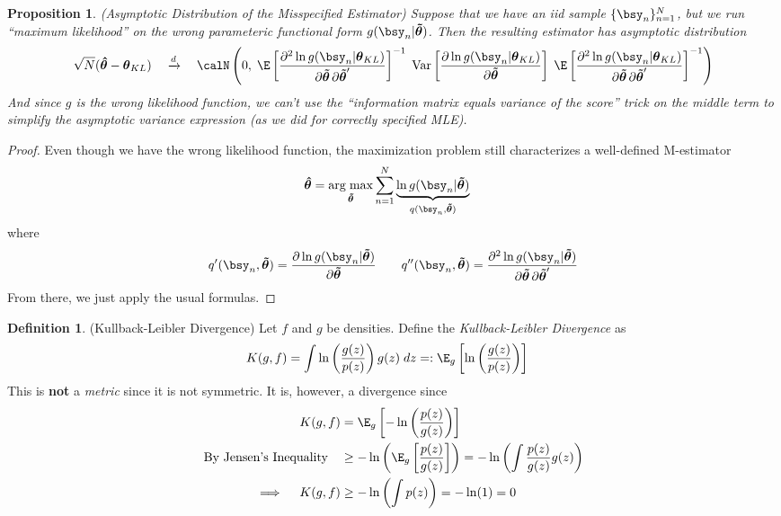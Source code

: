 \documentclass[12pt]{article}
\theoremstyle{plain}
\newtheorem{prop}[thm]{Proposition}
\theoremstyle{definition}
\newtheorem{defn}[thm]{Definition}
\theoremstyle{remark}
\newcommand{\bstheta}{\boldsymbol{\theta}}
\newcommand{\bshattheta}{\boldsymbol{\hat{\theta}}}
\newcommand{\bstildetheta}{\boldsymbol{\tilde{\theta}}}
\DeclareMathOperator*{\argmax}{arg\;max}
\newcommand{\Var}{\operatorname{Var}}
\newcommand{\dto}{\xrightarrow{d}}
\newcommand{\sumnN}{\sum^N_{n=1}}
\newcommand{\nN}{_{n=1}^N}
\begin{document}
\begin{prop}(Asymptotic Distribution of the Misspecified Estimator)
Suppose that we have an iid sample $\{\bsy_n\}\nN$, but we run ``maximum
likelihood'' on the \emph{wrong} parameteric functional form
$g(\bsy_n|\bstildetheta)$. Then the resulting estimator has asymptotic
distribution
\begin{align*}
  \sqrt{N}(\bshattheta-\bstheta_{KL})
  \quad\dto\quad
  \calN\left(0,\;
  \E\left[
  \frac{\partial^2 \ln g(\bsy_n|\bstheta_{KL})}{%
    \partial\bstildetheta\,\partial\bstildetheta'}
  \right]^{-1}
  \;
  \Var\left[
    \frac{\partial \ln g(\bsy_n|\bstheta_{KL})}{\partial \bstildetheta}
  \right]
  \;
  \E\left[
  \frac{\partial^2 \ln g(\bsy_n|\bstheta_{KL})}{%
    \partial\bstildetheta\,\partial\bstildetheta'}
  \right]^{-1}
  \right)
\end{align*}
And since $g$ is the wrong likelihood function, we can't use the
``information matrix equals variance of the score'' trick on the middle
term to simplify the asymptotic variance expression (as we did for
correctly specified MLE).
\end{prop}
\begin{proof}
Even though we have the wrong likelihood function, the maximization
problem still characterizes a well-defined M-estimator
\begin{align*}
  \bshattheta
  &=
  \argmax_{\bstildetheta}
  \sumnN
  \underbrace{%
  \ln g(\bsy_{n}|\bstildetheta)
  }_{q(\bsy_n,\bstildetheta)}
\end{align*}
where
\begin{align*}
  q'(\bsy_n,\bstildetheta)
  =
  \frac{\partial \ln g(\bsy_n|\bstildetheta)}{\partial \bstildetheta}
  \qquad
  q''(\bsy_n,\bstildetheta)
  =
  \frac{\partial^2 \ln g(\bsy_n|\bstildetheta)}{%
    \partial\bstildetheta\,\partial\bstildetheta'}
\end{align*}
From there, we just apply the usual formulas.
\end{proof}


\clearpage
\begin{defn}(Kullback-Leibler Divergence)
Let $f$ and $g$ be densities. Define the
\emph{Kullback-Leibler Divergence} as
\begin{align*}
  K(g,f)
  &= \int \ln\left(\frac{g(z)}{p(z)} \right) g(z)\;dz
  =: \E_g\left[
  \ln\left(\frac{g(z)}{p(z)} \right)
  \right]
\end{align*}
This is \textbf{not} a \emph{metric} since it is not symmetric. It is,
however, a divergence since
\begin{align*}
  K(g,f)
  &= \E_g\left[
  -\ln\left(\frac{p(z)}{g(z)}\right)
  \right] \\
  \text{By Jensen's Inequality}\quad
  &\geq
  -\ln\left(
  \E_g\left[
  \frac{p(z)}{g(z)}
  \right]  \right)
  =
  -\ln\left(
  \int
  \frac{p(z)}{g(z)}
  g(z)
  \right)
  \\
  \implies\quad
  K(g,f)
  &\geq
  -\ln\left(
  \int
  p(z)
  \right)
  = -\ln(1) = 0
\end{align*}
\end{defn}
\end{document}
